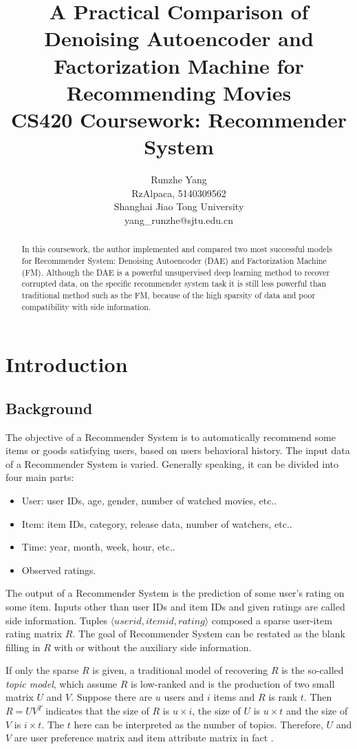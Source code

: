 \documentclass{article}
\title{A Practical Comparison of Denoising Autoencoder and Factorization Machine for Recommending Movies\\
	\Large{CS420 Coursework: Recommender System}}
\author{Runzhe Yang\\
{\small RzAlpaca, 5140309562} \\
{\small Shanghai Jiao Tong University}\\
{\small \textsf{yang\_runzhe@sjtu.edu.cn}}}
\begin{document}
\maketitle

\begin{abstract}
In this coursework, the author implemented and compared two most successful models for Recommender System: Denoising Autoencoder (DAE) and Factorization Machine (FM). Although the DAE is a powerful unsupervised deep learning method to recover corrupted data, on the specific recommender system task it is still less powerful than traditional method such as the FM, because of the high sparsity of data and poor compatibility with side information.
\end{abstract}

\section{Introduction}\label{sec:intro}
\subsection{Background}\label{sec:bg}
The objective of a Recommender System is to automatically recommend some items or goods satisfying users, based on users behavioral history. The input data of a Recommender System is varied. Generally speaking, it can be divided into four main parts: 
\begin{itemize}
	\item User: user IDs, age, gender, number of watched movies, etc..
	\item Item: item IDs, category, release data, number of watchers, etc..
	\item Time: year, month, week, hour, etc..
	\item Observed ratings.
\end{itemize}
The output of a Recommender System is the prediction of some user's rating on some item. Inputs other than user IDs and item IDs and given ratings are called side information.  Tuples $\langle userid, itemid, rating\rangle$ composed a sparse user-item rating matrix $R$. The goal of Recommender System can be restated as the blank filling in $R$ with or without the auxiliary side information.

If only the sparse $R$ is given, a traditional model of recovering $R$ is the so-called {\em topic model}, which assume $R$ is low-ranked and is the production of two small matrix $U$ and $V$. Suppose there are $u$ users and $i$ items and $R$ is rank $t$. Then $R = UV^T$ indicates that the size of $R$ is $u\times i$, the size of $U$ is $u \times t$ and the size of $V$ is $i \times t$. The $t$ here can be interpreted as the number of topics. Therefore, $U$ and $V$ are user preference matrix and item attribute matrix in fact .
\end{document}
